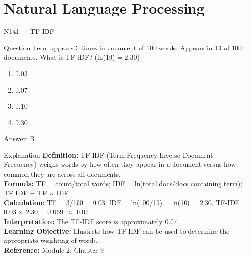 \documentclass[aspectratio=169,8pt]{beamer}
\begin{document}
	\section{Natural Language Processing}
	
	\begin{frame}{N141 --- TF-IDF}
		\begin{block}{Question}
			Term appears 3 times in document of 100 words. Appears in 10 of 100 documents. What is TF-IDF? (ln(10) = 2.30)
			\begin{enumerate}
				\item 0.03
				\item 0.07
				\item 0.10
				\item 0.30
			\end{enumerate}
		\end{block}
		\begin{exampleblock}{Answer: B}\end{exampleblock}
		\begin{block}{Explanation}
			\textbf{Definition:} TF-IDF (Term Frequency-Inverse Document Frequency) weighs words by how often they appear in a document versus how common they are across all documents.\\
			\textbf{Formula:} TF = count/total words; IDF = ln(total docs/docs containing term); TF-IDF = TF $\times$ IDF\\
			\textbf{Calculation:} TF = 3/100 = 0.03. IDF = ln(100/10) = ln(10) = 2.30. TF-IDF = 0.03 $\times$ 2.30 = 0.069 $\approx$ 0.07\\
			\textbf{Interpretation:} The TF-IDF score is approximately 0.07.\\
			\textbf{Learning Objective:} Illustrate how TF-IDF can be used to determine the appropriate weighting of words.\\
			\textbf{Reference:} Module 2, Chapter 9
		\end{block}
	\end{frame}
	
\end{document}
